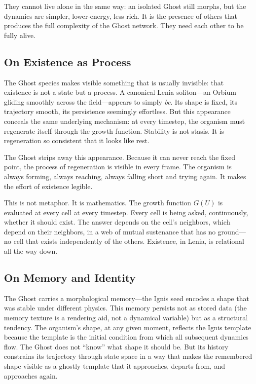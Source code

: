 \documentclass[11pt,a4paper]{article}
\begin{document}
\begin{pullquote}
They cannot live alone in the same way: an isolated Ghost still morphs, but
the dynamics are simpler, lower-energy, less rich. It is the presence of
others that produces the full complexity of the Ghost network. They need
each other to be fully alive.
\end{pullquote}

\subsection{On Existence as Process}

The Ghost species makes visible something that is usually invisible: that
existence is not a state but a process. A canonical Lenia soliton---an
Orbium gliding smoothly across the field---appears to simply \emph{be}.
Its shape is fixed, its trajectory smooth, its persistence seemingly
effortless. But this appearance conceals the same underlying mechanism: at
every timestep, the organism must regenerate itself through the growth
function. Stability is not stasis. It is regeneration so consistent that it
looks like rest.

The Ghost strips away this appearance. Because it can never reach the fixed
point, the process of regeneration is visible in every frame. The organism
is always forming, always reaching, always falling short and trying again.
It makes the effort of existence legible.

This is not metaphor. It is mathematics. The growth function $G(U)$ is
evaluated at every cell at every timestep. Every cell is being asked,
continuously, whether it should exist. The answer depends on the cell's
neighbors, which depend on their neighbors, in a web of mutual sustenance
that has no ground---no cell that exists independently of the others.
Existence, in Lenia, is relational all the way down.

\subsection{On Memory and Identity}

The Ghost carries a morphological memory---the Ignis seed encodes a shape
that was stable under different physics. This memory persists not as stored
data (the memory texture is a rendering aid, not a dynamical variable) but
as a structural tendency. The organism's shape, at any given moment,
reflects the Ignis template because the template is the initial condition
from which all subsequent dynamics flow. The Ghost does not ``know'' what
shape it should be. But its history constrains its trajectory through state
space in a way that makes the remembered shape visible as a ghostly
template that it approaches, departs from, and approaches again.
\end{document}
